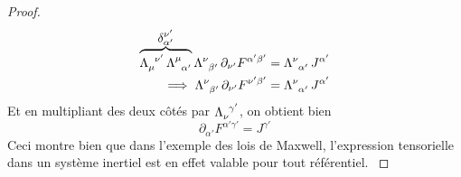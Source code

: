 \begin{proof}
{    \begin{align}
        \overbrace{\Lambda\indices{_\mu^{\nu '}}\, \Lambda\indices{^{\mu}_{\alpha'}}}^{\displaystyle\delta^{\nu '}_{\alpha' }}\Lambda\indices{^{\nu}_{\beta '}}\, \partial_{\nu '} F^{\alpha ' \beta '} & =  \Lambda\indices{^{\nu }_{\alpha'}}\,J^{\alpha '} \\
        \implies \Lambda\indices{^{\nu}_{\beta '}}\, \partial_{\nu '} F^{\nu ' \beta '}  &=  \Lambda\indices{^{\nu }_{\alpha'}}\, J^{\alpha '}
    \end{align}
    Et en multipliant des deux côtés par $\displaystyle\Lambda\indices{_\nu^{\gamma'}}$, on obtient bien
    \begin{equation}
        \partial_{\alpha '}F^{\alpha ' \gamma '} = J^{\gamma '}
    \end{equation}
    Ceci montre bien que dans l'exemple des lois de Maxwell, l'expression tensorielle dans un système inertiel est en effet valable pour tout référentiel.
    }
\end{proof}
